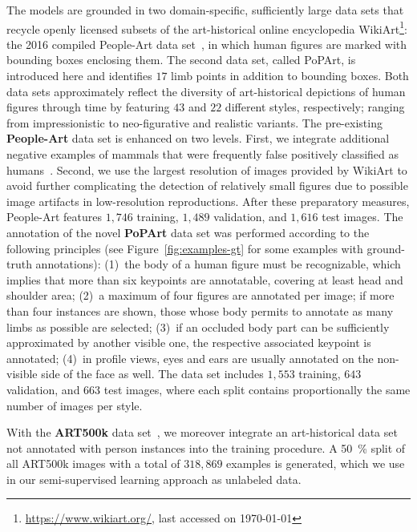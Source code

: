 \documentclass[sigconf]{acmart}
\begin{document}
The models are grounded in two domain-specific, sufficiently large data sets that recycle openly licensed subsets of the art-historical online encyclopedia WikiArt\footnote{\url{https://www.wikiart.org/}, last accessed on \today}: the 2016 compiled People-Art data set~\cite{DBLP:journals/corr/CaiWCH15, DBLP:conf/eccv/WestlakeCH16}, in which human figures are marked with bounding boxes enclosing them. 
The second data set, called \ac{PoPArt}, is introduced here and identifies $17$ limb points in addition to bounding boxes. 
Both data sets approximately reflect the diversity of art-historical depictions of human figures through time by featuring $43$ and $22$ different styles, respectively; ranging from impressionistic to neo-figurative and realistic variants. 
The pre-existing \textbf{People-Art} data set is enhanced on two levels. 
First, we integrate additional negative examples of mammals that were frequently false positively classified as humans~\cite{DBLP:conf/eccv/WestlakeCH16}. 
Second, we use the largest resolution of images provided by WikiArt to avoid further complicating the detection of relatively small figures due to possible image artifacts in low-resolution reproductions. After these preparatory measures, People-Art features $1,746$ training, $1,489$ validation, and $1,616$ test images. 
The annotation of the novel \textbf{\ac{PoPArt}} data set was performed according to the following principles (see Figure~\ref{fig:examples-gt} for some examples with ground-truth annotations): 
(1)~the body of a human figure must be recognizable, which implies that more than six keypoints are annotatable, covering at least head and shoulder area;
(2)~a maximum of four figures are annotated per image; if more than four instances are shown, those whose body permits to annotate as many limbs as possible are selected;
(3)~if an occluded body part can be sufficiently approximated by another visible one, the respective associated keypoint is annotated;
(4)~in profile views, eyes and ears are usually annotated on the non-visible side of the face as well. 
The data set includes $1,553$ training, $643$ validation, and $663$ test images, where each split contains proportionally the same number of images per style.

With the \textbf{ART500k} data set~\cite{DBLP:conf/mm/MaoCS17}, we moreover integrate an art-historical data set not annotated with person instances into the training procedure. A {\SI{50}{\percent}} split of all ART500k images with a total of $318,869$ examples is generated, which we use in our semi-supervised learning approach as unlabeled data.
\end{document}
